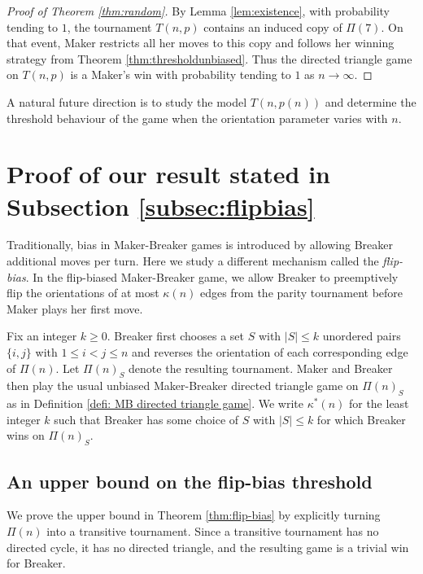 \documentclass{article}
\theoremstyle{definition}
\theoremstyle{plain}
\theoremstyle{remark}
\theoremstyle{definition}
\begin{document}
\begin{proof}[Proof of Theorem \ref{thm:random}]
By Lemma \ref{lem:existence}, with probability tending to $1$, the tournament $T(n,p)$ contains an induced copy of $\Pi(7)$.
On that event, Maker restricts all her moves to this copy and follows her winning strategy from Theorem \ref{thm:thresholdunbiased}.
Thus the directed triangle game on $T(n,p)$ is a Maker's win with probability tending to $1$ as $n\to\infty$.
\end{proof}

A natural future direction is to study the model $T(n,p(n))$ and determine the threshold behaviour of the game when the orientation parameter varies with $n$.

\section{Proof of our result stated in Subsection \ref{subsec:flipbias}}

Traditionally, bias in Maker-Breaker games is introduced by allowing Breaker additional moves per turn. Here we study a different mechanism called the \emph{flip-bias}. In the flip-biased Maker-Breaker game, we allow Breaker to preemptively flip the orientations of at most $\kappa(n)$ edges from the parity tournament before Maker plays her first move.

Fix an integer $k\ge 0$. Breaker first chooses a set $S$ with $|S|\le k$ unordered pairs $\{i,j\}$ with $1\le i<j\le n$ and reverses the orientation of each corresponding edge of $\Pi(n)$. Let $\Pi(n)_S$ denote the resulting tournament. Maker and Breaker then play the usual unbiased Maker-Breaker directed triangle game on $\Pi(n)_S$ as in Definition \ref{defi: MB directed triangle game}.
We write $\kappa^*(n)$ for the least integer $k$ such that Breaker has some choice of $S$ with $|S|\le 
k$ for which Breaker wins on $\Pi(n)_S$.

\subsection{An upper bound on the flip-bias threshold}\label{subsec: upper bound on flip-bias}

We prove the upper bound in Theorem \ref{thm:flip-bias} by explicitly turning $\Pi(n)$ into a transitive tournament. Since a transitive tournament has no directed cycle, it has no directed triangle, and the resulting game is a trivial win for Breaker.
\end{document}
